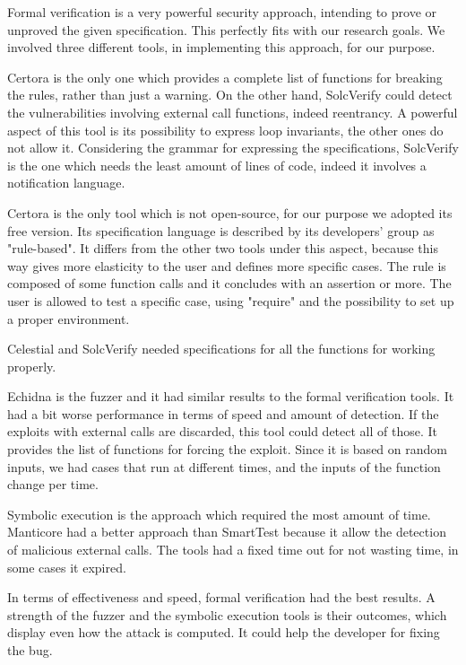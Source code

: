 Formal verification is a very powerful security approach, intending to prove or unproved the given specification. 
This perfectly fits with our research goals.
We involved three different tools, in implementing this approach, for our purpose. 

Certora is the only one which provides a complete list of functions for breaking the rules, rather than just a warning. 
On the other hand, SolcVerify could detect the vulnerabilities involving external call functions, indeed reentrancy. A powerful aspect of this tool is its possibility to express 
loop invariants, the other ones do not allow it.
Considering the grammar for expressing the specifications, SolcVerify is the one which needs the least amount of lines of code, indeed it involves a notification language.

Certora is the only tool which is not open-source, for our purpose we adopted its free version.
Its specification language is described by its developers' group as "rule-based". 
It differs from the other two tools under this aspect, because this way gives more elasticity to the user and defines more specific cases.
The rule is composed of some function calls and it concludes with an assertion or more. The user is allowed to test a specific case, 
using "require" and the possibility to set up a proper environment. 

Celestial and SolcVerify needed specifications for all the functions for working properly. 

Echidna is the fuzzer and it had similar results to the formal verification tools. 
It had a bit worse performance in terms of speed and amount of detection. If the exploits with external calls are discarded, this tool could detect all of those. 
It provides the list of functions for forcing the exploit. Since it is based on random inputs, we had cases that run at different times, and the inputs of the function change per time. 

Symbolic execution is the approach which required the most amount of time. Manticore had a better approach than SmartTest because it allow the detection of malicious external calls. 
The tools had a fixed time out for not wasting time, in some cases it expired. 

In terms of effectiveness and speed, formal verification had the best results.
A strength of the fuzzer and the symbolic execution tools is their outcomes, which display even how the attack is computed. It could help the developer for fixing the bug.

